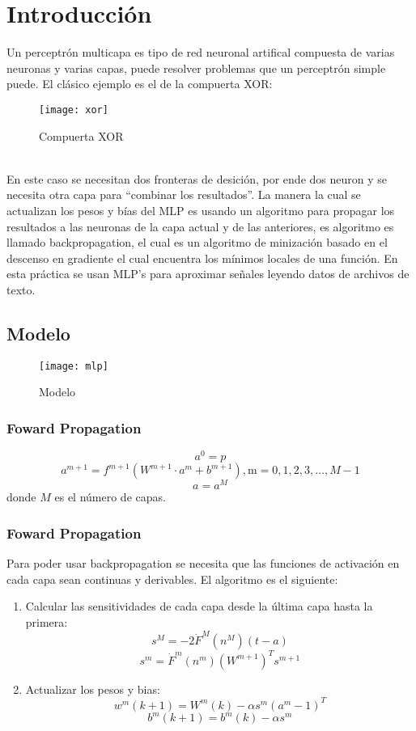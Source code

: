 \documentclass[6pt]{article}
\begin{document}
\maketitle
\tableofcontents
\section{Introducción}
Un perceptrón multicapa es tipo de red neuronal artifical compuesta de varias neuronas y varias capas, puede resolver problemas que un perceptrón simple puede. El clásico ejemplo es el de la compuerta XOR:
\begin{figure}[h!]
	\caption{Compuerta XOR}
	\centering
	\texttt{[image: xor]}
\end{figure}
\\
En este caso se necesitan dos fronteras de desición, por ende dos neuron y se necesita otra capa para ``combinar los resultados''. La manera la cual se actualizan los pesos y bías del MLP es usando un algoritmo para propagar los resultados a las neuronas de la capa actual y de las anteriores, es algoritmo es llamado backpropagation, el cual es un algoritmo de minización basado en el descenso en gradiente el cual encuentra los mínimos locales de una función. En esta práctica se usan MLP's para aproximar señales leyendo datos de archivos de texto.
\newpage
\subsection{Modelo}
\begin{figure}[h!]
	\caption{Modelo}
	\centering
	\texttt{[image: mlp]}
\end{figure}
\subsubsection{Foward Propagation}
$$ a^0 = p$$
$$ a^{m+1} = f^{m+1}(W^{m+1} \cdot a^m + b^{m+1}), \text{m}=0,1,2,3,\dots,M-1$$
$$ a=a^M $$
donde $M$ es el número de capas.\\
\subsubsection{Foward Propagation}
Para poder usar backpropagation se necesita que las funciones de activación en cada capa sean continuas y derivables.
El algoritmo es el siguiente:
\begin{enumerate}
	\item Calcular las sensitividades de cada capa desde la última capa hasta la primera: 
	$$ s^M = -2\dot{F}^M(n^M)(t-a)$$
	$$ s^m = \dot{F}^m(n^m)(W^{m + 1})^T s^{m+1} $$
	\item Actualizar los pesos y bias:
	$$ w^{m}(k+1) = W^m(k)-\alpha s^m(a^m-1)^T $$
	$$ b^{m}(k+1) = b^m(k)-\alpha s^m $$	
\end{enumerate}
\end{document}
